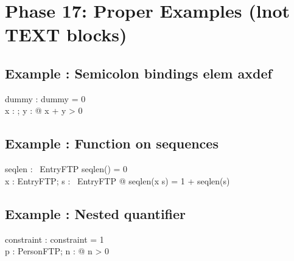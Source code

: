 \documentclass[a4paper,10pt,fleqn]{article}
\begin{document}
\section*{Phase 17: Proper Examples (lnot TEXT blocks)}

\subsection*{Example : Semicolon bindings elem axdef}

\begin{axdef}
dummy : \nat
\where
dummy = 0 \\
\forall x : \nat; y : \nat @ x + y > 0
\end{axdef}

\subsection*{Example : Function on sequences}

\begin{zed}
[EntryFTP]
\end{zed}

\begin{axdef}
seqlen : \seq~EntryFTP \fun \nat
\where
seqlen(\langle \rangle) = 0 \\
\forall x : EntryFTP; s : \seq~EntryFTP @ seqlen(\langle x \rangle \cat s) = 1 + seqlen(s)
\end{axdef}

\subsection*{Example : Nested quantifier}

\begin{zed}
[PersonFTP]
\end{zed}

\begin{axdef}
constraint : \nat
\where
constraint = 1 \\
\forall p : PersonFTP; n : \nat @ n > 0
\end{axdef}
\end{document}
